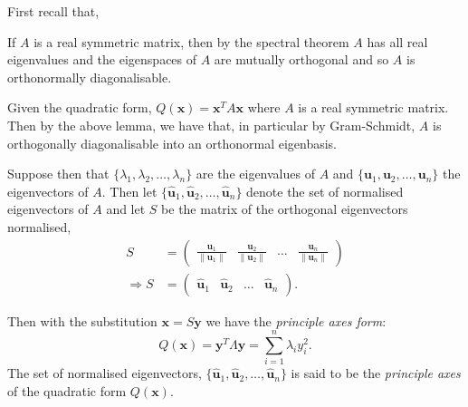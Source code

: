 First recall that,
\begin{lem}
 If $A$ is a real symmetric matrix, then by the spectral theorem
 $A$ has all real eigenvalues and the eigenspaces of $A$ are
 mutually orthogonal and so $A$ is orthonormally diagonalisable.
\end{lem}

\begin{thm}
 Given the quadratic form,
 $Q(\mathbf{x}) = \mathbf{x}^{T} A \mathbf{x}$
 where $A$ is a real symmetric matrix. Then by the above lemma,
 we have that, in particular by Gram-Schmidt, $A$ is orthogonally
 diagonalisable into an orthonormal eigenbasis.

 Suppose then that
 $\{\lambda_1, \lambda_2, \dots, \lambda_n\}$
 are the eigenvalues of $A$ and
 $\{\mathbf{u}_1, \mathbf{u}_2, \dots, \mathbf{u}_n\}$
 the eigenvectors of $A$. Then let
 $\{\hat{\mathbf{u}}_1, \hat{\mathbf{u}}_2, \dots, \hat{\mathbf{u}}_n\}$
 denote the set of normalised eigenvectors of $A$ and let $S$ be the
 matrix of the orthogonal eigenvectors normalised,
 \begin{align*}
  S &=
  \begin{pmatrix}
  \frac{\mathbf{u}_1}{\| \mathbf{u}_1 \|}
  &
  \frac{\mathbf{u}_2}{\| \mathbf{u}_2 \|}
  &
  \dots
  &
  \frac{\mathbf{u}_n}{\| \mathbf{u}_n \|}
  \end{pmatrix}
  \\
  \Rightarrow
  S &=
  \begin{pmatrix}
  \hat{\mathbf{u}}_1
  &
  \hat{\mathbf{u}}_2
  &
  \dots
  &
  \hat{\mathbf{u}}_n
  \end{pmatrix}.
 \end{align*}

 Then with the substitution $\mathbf{x} = S \mathbf{y}$
 we have the \emph{principle axes form}:
 \[
 Q(\mathbf{x})
 = \mathbf{y}^{T} \Lambda \mathbf{y}
 = \sum_{i=1}^{n} \lambda_i y_{i}^{2}.
 \]
 The set of normalised eigenvectors,
 $\{\hat{\mathbf{u}}_1, \hat{\mathbf{u}}_2, \dots, \hat{\mathbf{u}}_n\}$
 is said to be the \emph{principle axes} of the quadratic form $Q(\mathbf{x})$.
\end{thm}

